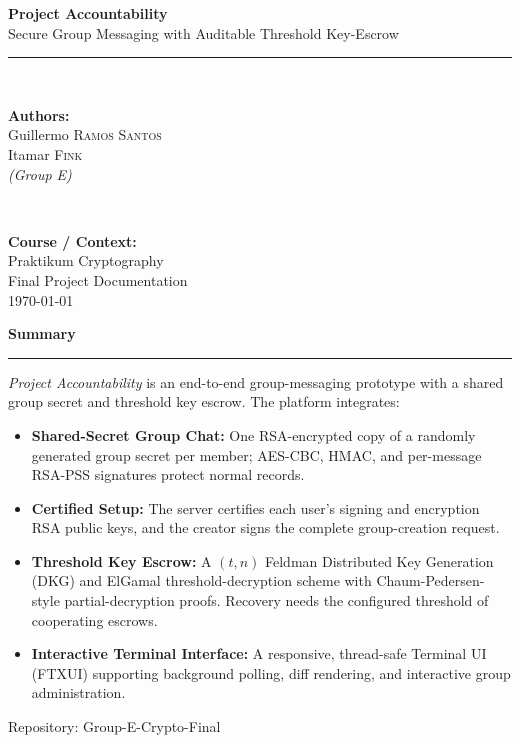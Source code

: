\documentclass[11pt,a4paper]{article}
\newenvironment{infobox}[1][]
  {\begin{center}\begin{minipage}{0.88\textwidth}\noindent\textbf{#1}\par\smallskip\hrule\smallskip}
  {\end{minipage}\end{center}}
\begin{document}
\begin{titlepage}
	\centering
	\vspace*{1cm}

	{\Huge \bfseries \color{primary} Project Accountability} \\[0.4cm]
	{\Large \color{secondary} Secure Group Messaging with Auditable Threshold Key-Escrow} \\[1.5cm]

	\rule{\linewidth}{0.5mm} \\[1.5cm]

	\begin{minipage}{0.48\textwidth}
		\begin{flushleft} \large
			\textbf{Authors:}\\[0.2cm]
			Guillermo \textsc{Ramos Santos} \\
			Itamar \textsc{Fink} \\
			\textit{(Group E)}
		\end{flushleft}
	\end{minipage}
	~
	\begin{minipage}{0.48\textwidth}
		\begin{flushright} \large
			\textbf{Course / Context:}\\[0.2cm]
			Praktikum Cryptography \\
			Final Project Documentation \\
			\today
		\end{flushright}
	\end{minipage}

	\vfill

	\begin{infobox}[Summary]
		\small
		\textit{Project Accountability} is an end-to-end group-messaging prototype with a shared group secret and threshold key escrow. The platform integrates:
		\begin{itemize}
			\item \textbf{Shared-Secret Group Chat:} One RSA-encrypted copy of a randomly generated group secret per member; AES-CBC, HMAC, and per-message RSA-PSS signatures protect normal records.
			\item \textbf{Certified Setup:} The server certifies each user's signing and encryption RSA public keys, and the creator signs the complete group-creation request.
			\item \textbf{Threshold Key Escrow:} A $(t,n)$ Feldman Distributed Key Generation (DKG) and ElGamal threshold-decryption scheme with Chaum-Pedersen-style partial-decryption proofs. Recovery needs the configured threshold of cooperating escrows.
			\item \textbf{Interactive Terminal Interface:} A responsive, thread-safe Terminal UI (FTXUI) supporting background polling, diff rendering, and interactive group administration.
		\end{itemize}
	\end{infobox}

	\vfill
	{\small Repository: Group-E-Crypto-Final}
\end{titlepage}
\end{document}
